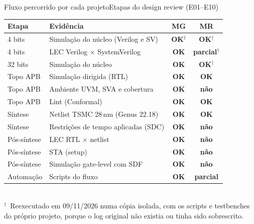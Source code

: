 \documentclass[aspectratio=169,10pt,t]{beamer}
\newcommand{\sOK}{\textcolor{tmOliva}{\textbf{OK}}}
\newcommand{\sNao}{\textcolor{tmVermelho}{\textbf{não}}}
\newcommand{\sParc}{\textcolor{tmDourado}{\textbf{parcial}}}
\newcommand{\rex}{$^{\dagger}$}
\newcommand{\MG}{\textbf{\color{tmCafe}MG}}
\newcommand{\MR}{\textbf{\color{tmVermelho}MR}}
\begin{document}
\begin{frame}{Fluxo percorrido por cada projeto}{Etapas do design review (E01–E10)}
  \footnotesize
  \renewcommand{\arraystretch}{1.18}
  \begin{tabularx}{\textwidth}{@{}l >{\raggedright\arraybackslash}X c c@{}}
    \toprule
    Etapa & Evidência & \MG & \MR \\
    \midrule
    4 bits & Simulação do núcleo (Verilog e SV) & \sOK\rex & \sOK\rex \\
    4 bits & LEC Verilog $\times$ SystemVerilog & \sOK & \sParc\rex \\
    32 bits & Simulação do núcleo & \sOK & \sOK\rex \\
    Topo APB & Simulação dirigida (RTL) & \sOK & \sOK \\
    Topo APB & Ambiente UVM, SVA e cobertura & \sOK & \sNao \\
    Topo APB & Lint (Conformal) & \sOK & \sOK \\
    Síntese & Netlist TSMC 28\,nm (Genus 22.18) & \sOK & \sOK \\
    Síntese & Restrições de tempo aplicadas (SDC) & \sOK & \sNao \\
    Pós-síntese & LEC RTL $\times$ netlist & \sOK & \sNao \\
    Pós-síntese & STA (setup) & \sOK & \sNao \\
    Pós-síntese & Simulação gate-level com SDF & \sOK & \sNao \\
    Automação & Scripts do fluxo & \sOK & \sParc \\
    \bottomrule
  \end{tabularx}\\[0.1cm]
  {\tiny \rex\ Reexecutado em 09/11/2026 numa cópia isolada, com os scripts e testbenches do próprio projeto, porque o log original não existia ou tinha sido sobrescrito.}
\end{frame}

\end{document}
